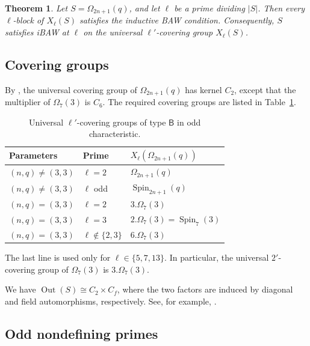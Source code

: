 \documentclass[10pt]{amsart}
\newtheorem{theorem}{Theorem}[section]
\theoremstyle{definition}
\DeclareMathOperator{\Out}{Out}
\numberwithin{equation}{section}
\numberwithin{table}{section}
\begin{document}
\begin{theorem}\label{thm:type-b}
Let $S=\Omega_{2n+1}(q)$, and let $\ell$ be a prime dividing $|S|$.
Then every $\ell$-block of $X_\ell(S)$ satisfies the inductive BAW
condition.  Consequently, $S$ satisfies iBAW at $\ell$ on the universal
$\ell'$-covering group $X_\ell(S)$.
\end{theorem}

\subsection{Covering groups}\label{subsec:type-b-covers}

By
\cite[Tables~24.2--24.3 and Remark~24.19]{MalleTesterman2011}, the
universal covering group of $\Omega_{2n+1}(q)$ has kernel $C_2$, except that the
multiplier of $\Omega_7(3)$ is $C_6$.  The required covering groups are
listed in Table~\ref{tab:typeb-covers}.

\begin{table}[ht]
\centering
\caption{Universal $\ell'$-covering groups of type $\mathsf B$ in odd characteristic.}
\label{tab:typeb-covers}
\begin{tabular}{@{}lll@{}}
\toprule
Parameters & Prime & $X_\ell(\Omega_{2n+1}(q))$ \\
\midrule
$(n,q)\neq(3,3)$ & $\ell=2$
  & $\Omega_{2n+1}(q)$ \\
$(n,q)\neq(3,3)$ & $\ell$ odd
  & $\operatorname{Spin}_{2n+1}(q)$ \\
$(n,q)=(3,3)$ & $\ell=2$
  & $3.\Omega_7(3)$ \\
$(n,q)=(3,3)$ & $\ell=3$
  & $2.\Omega_7(3)=\operatorname{Spin}_7(3)$ \\
$(n,q)=(3,3)$ & $\ell\notin\{2,3\}$
  & $6.\Omega_7(3)$ \\
\bottomrule
\end{tabular}
\end{table}

The last line is used only for $\ell\in\{5,7,13\}$.  In particular, the
universal $2'$-covering group of $\Omega_7(3)$ is $3.\Omega_7(3)$.

We have $\Out(S)\cong C_2\times C_f$, where the two factors are induced by
diagonal and field automorphisms, respectively.  See, for example,
\cite[Proposition~24.21 and Theorem~24.24]{MalleTesterman2011}.

\subsection{Odd nondefining primes}\label{subsec:type-b-odd-primes}
\end{document}
